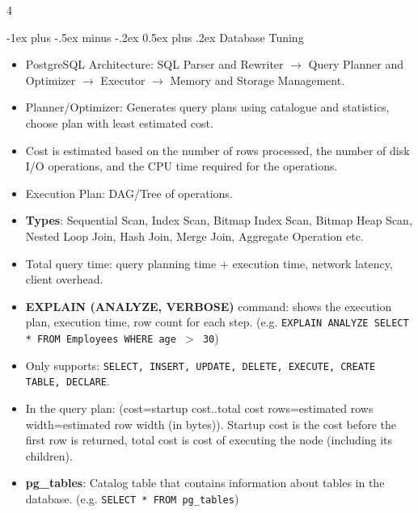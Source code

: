 \documentclass[10pt, landscape]{article}
\makeatletter
\renewcommand{\section}{\@startsection{section}{1}{0mm}%
  {-1ex plus -.5ex minus -.2ex}%
  {0.5ex plus .2ex}%
{\normalfont\large\bfseries}}
\makeatother
\begin{document}
\raggedright
\footnotesize
\begin{multicols*}{4}
  \setlength{\columnseprule}{0.25pt}

  \begin{center}
  \end{center}

   \section{Database Tuning}
  \begin{itemize}
    \item PostgreSQL Architecture: SQL Parser and Rewriter $\rightarrow$ Query Planner and Optimizer $\rightarrow$ Executor $\rightarrow$ Memory and Storage Management.
    \item Planner/Optimizer: Generates query plans using catalogue and statistics, choose plan with least estimated cost.
    \item Cost is estimated based on the number of rows processed, the number of disk I/O operations, and the CPU time required for the operations.
    \item Execution Plan: DAG/Tree of operations. 
    \item \textbf{Types}: Sequential Scan, Index Scan, Bitmap Index Scan, Bitmap Heap Scan, Nested Loop Join, Hash Join, Merge Join, Aggregate Operation etc.
    \item Total query time: query planning time + execution time, network latency, client overhead.
    \item \textbf{EXPLAIN (ANALYZE, VERBOSE)} command: shows the execution plan, execution time, row count for each step. (e.g. \texttt{EXPLAIN ANALYZE SELECT * FROM Employees WHERE age $>$ 30})
    \item Only supports: \texttt{SELECT, INSERT, UPDATE, DELETE, EXECUTE, CREATE TABLE, DECLARE}.
    \item In the query plan: (cost=startup cost..total cost rows=estimated rows width=estimated row width (in bytes)). Startup cost is the cost before the first row is returned, total cost is cost of executing the node (including its children).
    \item \textbf{pg\_tables}: Catalog table that contains information about tables in the database. (e.g. \texttt{SELECT * FROM pg\_tables})

\end{itemize}
\end{multicols*}
\end{document}
